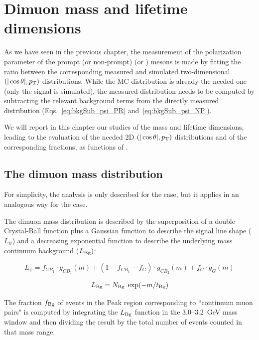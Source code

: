 \section{Dimuon mass and lifetime dimensions}
\label{sec:mass-lifetime}

As we have seen in the previous chapter,
the measurement of the \lth polarization parameter of 
the prompt (or non-prompt) \jpsi (or \psip) mesons 
is made by fitting the ratio between the corresponding measured and simulated 
two-dimensional $(|\cos\theta|,p_\text{T})$ distributions.
While the MC distribution is already the needed one (only the signal is simulated),
the measured distribution needs to be computed by subtracting 
the relevant background terms from the directly measured distribution 
(Eqs.~\ref{eq:bkgSub_psi_PR} and~\ref{eq:bkgSub_psi_NP}).

We will report in this chapter our studies of the mass and lifetime dimensions, 
leading to the evaluation of the needed 2D $(|\cos\theta|,p_\text{T})$ distributions
and of the corresponding fractions, as functions of \pt.

\subsection{The dimuon mass distribution}
\label{sec:mass}

For simplicity, the analysis is only described for the \jpsi case,
but it applies in an analogous way for the \psip case.

The dimuon mass distribution is described by the superposition of
a double Crystal-Ball function plus a Gaussian function 
to describe the \jpsi signal line shape ($L_{\psi}$)
and a decreasing exponential function 
to describe the underlying mass continuum background ($L_{\rm Bg})$:

\begin{equation}
L_{\psi} = f_{CB_1}\cdot g_{CB_1}(m) + (1-f_{CB_1}-f_G)\cdot g_{CB_2}(m) + f_G\cdot g_{G}(m)
\end{equation}


\begin{equation}
L_{\rm Bg} = N_{\rm Bg} \; \exp(-m/t_{\rm Bg})
\end{equation}


The fraction $f_{\rm Bg}$ of events in the Peak region
corresponding to ``continuum muon pairs"
is computed by integrating the $L_{\rm Bg}$ function
in the 3.0--3.2~GeV mass window 
and then dividing the result by the total number of events
counted in that mass range.

